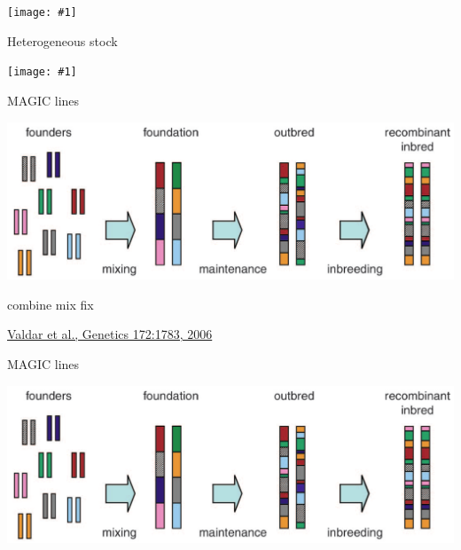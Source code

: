 \documentclass[12pt]{article}
\newcommand{\headsize}{\fontsize{35}{35} \selectfont}
\newcommand{\smallsize}{\fontsize{25}{30} \selectfont}
\newcommand{\citesize}{\fontsize{14}{18} \selectfont}
\newcommand{\figh}[2]{\centerline{\texttt{[image: \#1]}}}
\begin{document}
\vspace{5mm}

\figh{Figs/ri8.pdf}{0.9}


\newpage

\headsize \color{myyellow}
\hfill \begin{minipage}{5.75in}
\centering
Heterogeneous stock
\end{minipage}


\vspace{5mm}

\figh{Figs/hs.pdf}{0.9}


\newpage

\newpage

\headsize \color{myyellow}
\hfill \begin{minipage}{5.75in}
\centering
MAGIC lines
\end{minipage}

\vspace{20mm}

\centerline{\includegraphics[width=10in]{Figs/valdar_genet2006.png}}

\smallsize \color{myyellow}
\hspace*{52mm} combine \hspace*{35mm} mix \hspace*{52mm} fix

\vfill

\hfill {\citesize \color{citecolor} \href{http://www.genetics.org/content/172/3/1783.full}{Valdar et al., Genetics 172:1783, 2006}}

\vspace*{5mm}

\newpage

\addtocounter{page}{-1}

\headsize \color{myyellow}
\hfill \begin{minipage}{5.75in}
\centering
MAGIC lines
\end{minipage}

\vspace{20mm}

\centerline{\includegraphics[width=10in]{Figs/valdar_genet2006.png}}
\end{document}
